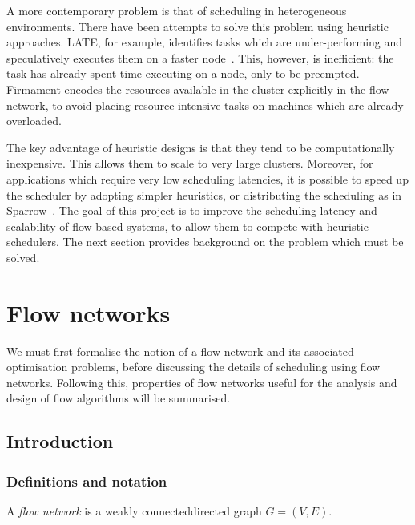A more contemporary problem is that of scheduling in heterogeneous environments. There have been attempts to solve this problem using heuristic approaches. LATE, for example, identifies tasks which are under-performing and speculatively executes them on a faster node~\cite{Zaharia:2008}. This, however, is inefficient: the task has already spent time executing on a node, only to be preempted. Firmament encodes the resources available in the cluster explicitly in the flow network, to avoid placing resource-intensive tasks on machines which are already overloaded.

The key advantage of heuristic designs is that they tend to be computationally inexpensive. This allows them to scale to very large clusters. Moreover, for applications which require very low scheduling latencies, it is possible to speed up the scheduler by adopting simpler heuristics, or distributing the scheduling as in Sparrow~\cite{Ousterhout:2013}. The goal of this project is to improve the scheduling latency and scalability of flow based systems, to allow them to compete with heuristic schedulers. The next section provides background on the problem which must be solved.

\section{Flow networks} \label{prep-flow}

We must first formalise the notion of a flow network and its associated optimisation problems, before discussing the details of scheduling using flow networks. Following this, properties of flow networks useful for the analysis and design of flow algorithms will be summarised.

\subsection{Introduction}


\subsubsection{Definitions and notation}

A \emph{flow network} is a weakly connected\footnotemark directed graph $G=(V,E)$.


